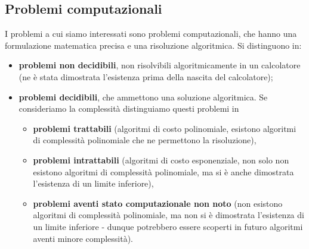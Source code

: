 \subsection{Problemi computazionali}
I problemi a cui siamo interessati sono problemi computazionali, che hanno una formulazione matematica precisa e una risoluzione algoritmica. Si distinguono in:
\begin{itemize}
	\item \textbf{problemi non decidibili}, non risolvibili algoritmicamente in un calcolatore (ne è stata dimostrata l’esistenza prima della nascita del calcolatore);
	\item \textbf{problemi decidibili}, che ammettono una soluzione algoritmica. Se consideriamo la complessità distinguiamo questi problemi in
	\begin{itemize}
		\item \textbf{problemi trattabili} (algoritmi di costo polinomiale, esistono algoritmi di complessità polinomiale che ne permettono la risoluzione),
		\item \textbf{problemi intrattabili} (algoritmi di costo esponenziale, non solo non esistono algoritmi di complessità polinomiale, ma si è anche dimostrata l'esistenza di un limite inferiore),
		\item \textbf{problemi aventi stato computazionale non noto} (non esistono algoritmi di complessità polinomiale, ma non si è dimostrata l'esistenza di un limite inferiore - dunque potrebbero essere scoperti in futuro algoritmi aventi minore complessità).
	\end{itemize}
\end{itemize}



